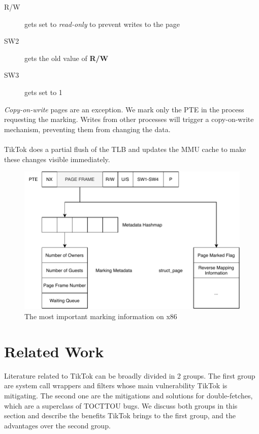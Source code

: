 \begin{description}
  \item[R/W] gets set to \emph{read-only} to prevent writes to the page
  \item[SW2] gets the old value of \textbf{R/W}
  \item[SW3] gets set to 1 
\end{description}

\emph{Copy-on-write} pages are an exception. We mark only the PTE in the process
requesting the marking. Writes from other processes will trigger a copy-on-write
mechanism, preventing them from changing the data.
\\
\\
TikTok does a partial flush of the TLB and updates the MMU cache to make these
changes visible immediately.

\begin{figure}[]
  \centering
  \includegraphics[width=\linewidth]{img/book-keeping.pdf}
  \caption{The most important marking information on x86}
  \label{fig:bookkeeping}
\end{figure}



\section{Related Work}
\label{sec:relatedwork}
Literature related to TikTok can be broadly divided in 2 groups. The first group
are system call wrappers and filters whose main vulnerability TikTok is
mitigating. The second one are the mitigations and solutions for double-fetches,
which are a superclass of TOCTTOU bugs. We discuss both groups in this section
and describe the benefits TikTok brings to the first group, and the advantages
over the second group.


